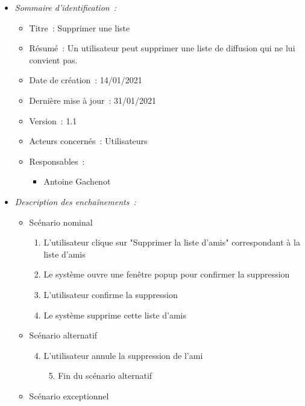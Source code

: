 \begin{itemize}

\item \textit{Sommaire d'identification~:}

    \begin{itemize}
    
    \item Titre~: Supprimer une liste
    
    \item Résumé~: Un utilisateur peut supprimer une liste de diffusion qui ne lui convient pas.
    
    \item Date de création~: 14/01/2021
    
    \item Dernière mise à jour~: 31/01/2021
    
    \item Version~: 1.1
    
    \item Acteurs concernés~: Utilisateurs
    
    \item Responsables~: 
    \begin{itemize}
        \item Antoine Gachenot
    \end{itemize}
    
    \end{itemize}

\item \textit{Description des enchaînements~:}
\begin{itemize}
\item Scénario nominal
\begin{enumerate}
       \item L'utilisateur clique sur "Supprimer la liste d'amis" correspondant à la liste d'amis
       \item Le système ouvre une fenêtre popup pour confirmer la suppression
       \item L'utilisateur confirme la suppression
       \item Le système supprime cette liste d'amis
    \end{enumerate}
    \item Scénario alternatif
        \begin{enumerate}[{1{a}.}]\setcounter{enumi}{3}
            \item L'utilisateur annule la suppression de l'ami
            \begin{enumerate}[{1.}]\setcounter{enumii}{4}
                \item Fin du scénario alternatif
            \end{enumerate}
        \end{enumerate}
    \item Scénario exceptionnel
\end{itemize}


\end{itemize}
